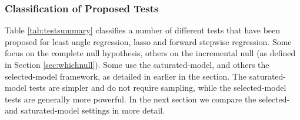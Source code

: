 \documentclass{article}
\begin{document}

\subsubsection{Classification of Proposed Tests}
Table \ref{tab:testsummary} classifies a number of different tests that have been proposed for least angle regression, lasso and forward stepwise regression. Some focus on the complete null hypothesis, others on the incremental null (as defined in Section \ref{sec:whichnull}).
Some use the saturated-model, and others the selected-model framework, as detailed in earlier in the section.
The saturated-model tests are simpler and do not require sampling, while the selected-model tests are generally more powerful. In the next section we compare the selected- and saturated-model settings in more detail.
\end{document}
